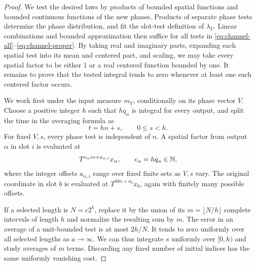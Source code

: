 \begin{proof}
We test the desired laws by products of bounded spatial functions and
bounded continuous functions of the new phases.  Products of separate
phase tests determine the phase distribution, and fit the slot-test
definition of $\lambda_Y$.  Linear combinations and bounded
approximation then suffice for all tests in
\eqref{eq:channel-all}--\eqref{eq:channel-proper}.
By taking real and imaginary parts, expanding each spatial test into
its mean and centered part, and scaling, we may take every spatial
factor to be either $1$ or a real centered function bounded by one.
It remains to prove that the tested integral tends to zero whenever
at least one such centered factor occurs.

We work first under the input measure $m_Y$, conditionally on its phase
vector $V$.  Choose a positive integer $h$ such that
$hq_\alpha$ is integral for every output, and split the time in the
averaging formula as
\begin{equation}\label{eq:channel-time-split}
                       t=hn+s,\qquad 0\le s<h.
\end{equation}
For fixed $V,s$, every phase test is independent of $n$.  A spatial
factor from output $\alpha$ in slot $i$ is evaluated at
\begin{equation}\label{eq:channel-affine-times}
                T^{e_\alpha i n+a_{\alpha,i}}x_\alpha,
       \qquad e_\alpha=hq_\alpha\in\mathbb N,
\end{equation}
where the integer offsets $a_{\alpha,i}$ range over fixed finite sets
as $V,s$ vary.  The original coordinate in slot $b$ is evaluated at
$T^{hb n+a_0}x_0$, again with finitely many possible offsets.

If a selected length is $N=c2^k$, replace it by the union of its
$m=\lfloor N/h\rfloor$ complete intervals of length $h$ and normalize
the resulting sum by $m$.  The error in an average of a unit-bounded
test is at most $2h/N$.  It tends to zero uniformly over all selected
lengths as $a\to\infty$.  We can thus integrate $s$ uniformly over
$[0,h)$ and study averages of $m$ terms.  Discarding any fixed number
of initial indices has the same uniformly vanishing cost.


\end{proof}
